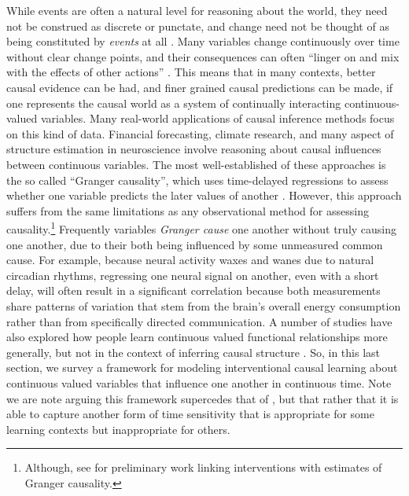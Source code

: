 \documentclass{cambridge7A}%
\newcommand{\ttodo}[2][]{\vspace{0.1cm} \hfil \todo[caption={\textbf{TG}}, size=\footnotesize, color = orange, inline, #1]{#2}}
\begin{document}
While events are often a natural level for reasoning about the world, they need not be construed as discrete or punctate, and change need not be thought of as being constituted by \emph{events} at all \citep{soo2018causal}.  Many variables change continuously over time without clear change points, and their consequences can often ``linger on and mix with the effects of other actions'' \citep[p224]{jordan1992forward}. This means that in many contexts, better causal evidence can be had, and finer grained causal predictions can be made, if one represents the causal world as a system of continually interacting continuous-valued variables.  Many real-world applications of causal inference methods focus on this kind of data.  Financial forecasting, climate research, and many aspect of structure estimation in neuroscience involve reasoning about causal influences between continuous variables.   The most well-established of these approaches is the so called ``Granger causality'', which uses time-delayed regressions to assess whether one variable predicts the later values of another \citep{granger1969investigating}.  However, this approach suffers from the same limitations as any observational method for assessing causality.\footnote{Although, see \cite{eichler2010granger} for preliminary work linking interventions with estimates of Granger causality.}  Frequently variables \emph{Granger cause} one another without truly causing one another, due to their both being influenced by some unmeasured common cause.  For example, because neural activity waxes and wanes due to natural circadian rhythms, regressing one neural signal on another, even with a short delay, will often result in a significant correlation because both measurements share patterns of variation that stem from the brain's overall energy consumption rather than from specifically directed communication.  %
A number of studies have also explored how people learn continuous valued functional relationships more generally, but not in the context of inferring causal structure \citep{pacer2011rational,griffiths2009modeling,schulz2017compositional}.  So, in this last section, we survey a framework for modeling interventional causal learning about continuous valued variables that influence one another in continuous time. Note we are note arguing this framework supercedes that of \cite{bramley2018time}, but that rather that it is able to capture another form of time sensitivity that is appropriate for some learning contexts but inappropriate for others.%
\end{document}
